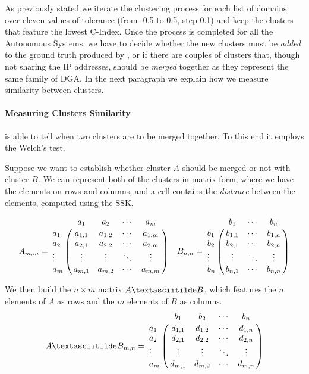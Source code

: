 As previously stated we iterate the clustering process for each list of domains over eleven
values of tolerance (from -0.5 to 0.5, step 0.1) and keep the clusters that
feature the lowest C-Index. Once the process is completed for all the Autonomous Systems,
we have to decide whether the new clusters must be \emph{added} to the ground truth
produced by \phoenix, or if there are couples of clusters that, though not sharing the
IP addresses, should be \emph{merged} together as they represent the same family of DGA.
In the next paragraph we explain how we measure similarity between clusters.


\paragraph{Measuring Clusters Similarity} %
\label{par:measuring_clusters_similarity}
\thesystem is able to tell when two clusters are to be merged together. To this
end it employs the Welch's test.

Suppose we want to establish whether cluster $A$ should be merged or not with
cluster $B$. We can represent both of the clusters in matrix form, where we have
the elements on rows and columns, and a cell contains the \emph{distance} between
the elements, computed using the SSK.

\[
A_{m,m} =
\bordermatrix{
         & a_1     & a_2     & \cdots & a_m     \cr
  a_1    & a_{1,1} & a_{1,2} & \cdots & a_{1,m} \cr
  a_2    & a_{2,1} & a_{2,2} & \cdots & a_{2,m} \cr
  \vdots & \vdots  & \vdots  & \ddots & \vdots  \cr
  a_m    & a_{m,1} & a_{m,2} & \cdots & a_{m,m}}
 \quad
 B_{n,n} =
 \bordermatrix{
         & b_1     &  \cdots & b_n     \cr
  b_1    & b_{1,1} &  \cdots & b_{1,n} \cr
  b_2    & b_{2,1} &  \cdots & b_{2,n} \cr
  \vdots & \vdots  &  \ddots & \vdots  \cr
  b_n    & b_{n,1} & \cdots & b_{n,n}}
\]

We then build the $n \times m$ matrix $A \textasciitilde B$, which features the $n$
elements of $A$ as rows and the $m$ elements of $B$ as columns.
\[
 A \textasciitilde B_{m,n} =
 \bordermatrix{
         & b_1     & b_2     & \cdots & b_n     \cr
  a_1    & d_{1,1} & d_{1,2} & \cdots & d_{1,n} \cr
  a_2    & d_{2,1} & d_{2,2} & \cdots & d_{2,n} \cr
  \vdots & \vdots  & \vdots  & \ddots & \vdots  \cr
  a_m    & d_{m,1} & d_{m,2} & \cdots & d_{m,n}}
\]

